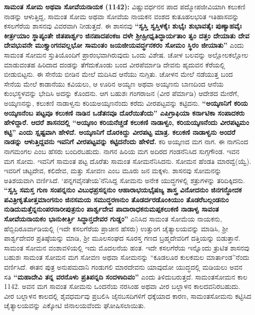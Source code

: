 \textbf{ಸಾಮಂತ ಸೋಮ ಅಥವಾ ಸೋವೆಯನಾಯಕ (1142):} ವಿಷ್ಣುವರ್ಧನನ ಪಾದ ಪದ್ಮೋಪಜೀವಿಯಾಗಿ ಕಲುಕಣಿ ನಾಡನ್ನು ಆಳುತ್ತಿದ್ದ, ಸಾಮಂತ ಸೋಮ ಅಥವಾ ಸೋವೆಯ ನಾಯಕನ ವಂಶದ ಕುತೂಹಲಭರಿತ ಇತಿಹಾಸವನ್ನು ಕಸಲಗೆರೆಯ ಶಾಸನವು ವಿವರವಾಗಿ ನೀಡುತ್ತದೆ. ಈ ಶಾಸನವು \textbf{“ಸ್ವಸ್ತಿ ಸ್ವಸ್ತಿಳಕೈಃ ಶುಭೈಃ ಶುಭಾವತೈಃ ಪುಣ್ಯಾಹವೈಃ ಕೀರ್ತ್ರಯಾಂ ಸ್ಥಾಪ್ಯಂತೇ ಜಿತಪಾರ್ಶ್ವಂ ಜಿನಪಾದಪಂಕಜ ದಳೇ ಶ‍್ರೀಹ್ರೀಧೃತಿದ್ಧಾರ್ಯತಾಂ ತ್ವಂ ದತ್ತಂ ದೇಯಾತು ದೇವ ದೇವಭುವನೇ ಮುಕ್ತ್ಯಾಂಗನವಲ್ಲಭೋ ಸಾಮಂತಂ ಜಯಜೀಯವರ್ದ್ಧನಕರಂ ಸೋಮಂ ಸ್ಥಿರಂ ಜೀಯಾತು”} ಎಂದು ಸಾಮಂತ ಸೋಮನ ಸ್ತುತಿಯೊಂದಿಗೆ ಪ್ರಾರಂಭವಾಗಿರುವುದು ಒಂದು ವಿಶೇಷ. ಚೋಳ ಬಲವನ್ನು ಅಲ್ಲೋಲಕಲ್ಲೋಲ ಮಾಡುವಂತಹ ಹಿರಿದಾದ ದಂಡನ್ನು ತೆಗೆದುಕೊಂಡು ಬಂದ ವೀರಪೆರ್ಮಾಡಿ ದೇವನು ಹೃದುವನ ಕೆರೆಯಲ್ಲಿ ಬೀಡುಬಿಟ್ಟನು. ಈ ಸೇನೆಯ ಬೀಡಿನ ಮೇಲೆ ಮದಿಸಿದ ಆನೆಯು ನುಗ್ಗಿತು. ಚೋಳನ ಮೇಲೆ ನಡೆಯುತ್ತ ಬಂದ ಸೇನೆಯ ಮೇಲೆ ಕಾಡಾನೆಯು ಕವಿಯಲು, ಆ ಊರಿನ ಅಯ್ಯಣ ಅಥವಾ ಅಯ್ಕಣನು ಬಾಣದಿಂದ ಆನೆಯ ಕುಂಭಸ್ಥಳವನ್ನು ಭೇದಿಸಿ ಅದನ್ನು ಕೊಂದನು. ಆಗ ಬಹುಶಃ ಗಂಗರಾಜನ (ವೀರ ಪೆರ್ಮಾಡಿ) ಆದೇಶದ ಮೇರೆಗೆ, ಅಯ್ಕಣನನ್ನು, ಕಲುಕಣಿ ನಾಡಾಳ್ವನು ಕರಿಯಅಯ್ಕಣನೆಂದು ಕರೆದು ವೀರಪಟ್ಟವನ್ನು ಕಟ್ಟಿದನು. \textbf{“ಅಯ್ಕಣನಿಗೆ ಕರಿಯ ಅಯ್ಕಣನೆಂಬ ಪಟ್ಟವೂ ಕಲುಕಣಿ ನಾಡಿನ ಒಡೆತನವೂ ದೊರೆಯಿತೆಂದು” ಎಪಿಗ್ರಾಫಿಯಾ ಕರ್ನಾಟಿಕಾ ಸಂಪಾದಕರು ಹೇಳಿದ್ದಾರೆ. ಆದರೆ ಶಾಸನದಲ್ಲಿ “ಅಯ್ಕಣಂ ಕರಿಯನೆಚ್ಚಡೆ ಕಲುಕಣಿ ನಾಡಾಳ್ವಂ, ಕರಿಯಯ್ಕಣನೆಂದು ವೀರಪಟ್ಟಮಂ ಕಟ್ಟಿ” ಎಂದು ಸ್ಷಷ್ಟವಾಗಿ ಹೇಳಿದೆ. ಅಯ್ಕಣನಿಗೆ ದೊರಕಿದ್ದು ವೀರಪಟ್ಟ ಮಾತ್ರ. ಕಲುಕಣಿ ನಾಡಾಳ್ವನು ಅಂದರೆ ನಾಡನ್ನು ಆಳುತ್ತಿದ್ದವನು ಇವನಿಗೆ ವೀರಪಟ್ಟವನ್ನು ಕಟ್ಟಿದನೆಂದು ಹೇಳಿದೆ.} ಕರಿ ಅಯ್ಕಣದ ಮಗ ನಾಗ. ಈ ನಾಗನಿಂದ ನಾಗಮಂಗಲ ಎಂಬ ಹೆಸರು ಬಂದಿರಬಹುದು. ನಾಗನ ಹಿರಿಯ ಮಗ ಅದಿರದ ಗಂಡನೆನಿಸಿದ ಸುಗ್ಗಗೌಂಡ. ಇವನ ಮಗ ಸೋಮ. ಇವನಿಗೆ ಸಾಮಂತ ಪಟ್ಟ ದೊರೆತು ಸಾಮಂತ ಸೋಮನೆನಿಸಿದನು. ಸೋಮನ ಹೆಂಡತಿ ಮಾರವ್ವೆ(ಯ್ವೆ). ಇವರಿಗೆ ಚಟ್ಟದೇವ, ಕಲಿದೇವ, ಮತ್ತು ಸೋವಣ ಎಂಬ ಮೂರು ಜನ ಮಕ್ಕಳು. ಶಾಸನವು ಸೋಮನನ್ನು ಅತಿಶಯವಾಗಿ ವರ್ಣಿಸಿದೆ. ‘ಪನ್ನಗವೈನತೇಯ’ನೆನಿಸಿದ್ದ ಸೋಮನು ಅನೇಕ ಯುದ್ಧಗಳಲ್ಲಿ ಶತ್ರುಗಳನ್ನು ತರಿದಿಕ್ಕಿದನು. \textbf{“ಸ್ವಸ್ತಿ ಸಮಸ್ತ ಗುಣ ಸಂಪನ್ನನುಂ ವಿಬುಧಪ್ರಸನ್ನನುಂ ಆಹಾರಾಭಯಭೈಷಜ್ಯ ಶಾಸ್ತ್ರ ವಿನೋದನುಂ ಜಿನಗನ್ಧೋದಕ ಪವಿತ್ರೀಕೃತೋತ್ತಮಾಂಗನುಂ ಜಿನಸಮಯ ಸಮುದ್ಧರಣನುಂ ತೊಡರ್ದರಡೊಂಕಿಯುಂ ತೊಡರೆಬಲ್ಗಂಡನುಂ ನುಡಿದುಮತ್ತೆನ್ನನುಂಪರನಾರೀಪುತ್ರನುಂ ಪಾರ್ಶ್ವದೇವ ಪಾದಾರಾಧಕನುಮಪ್ಪಕಲುಕಣಿ ನಾಡಾಳ್ವ ಸಾವಂತ ಸೋವೆಯನಾಯಕಂ ಭಾನುಕೀರ್ತ್ತಿ ಸಿದ್ಧಾನ್ತದೇವರ ಗುಡ್ಡಂ”} ಎನಿಸಿದ ಸಾಮಂತ ಸೋಮೆಯ ನಾಯಕನು, ಹೆಬ್ಬಿದಿರೂರ್ವಾಡಿಯಲ್ಲಿ (ಇದೇ ಕಸಲಗೆರೆಯ ಪ್ರಾಚೀನ ಹೆಸರು) ಉತ್ತುಂಗ ಚೈತ್ಯಾಲಯವನ್ನು ಮಾಡಿಸಿ, ಶ‍್ರೀ ಪಾರ್ಶ್ವದೇವರ ಪ್ರತಿಷ್ಠೆಯನ್ನು ಮಾಡಿ, ಶ‍್ರೀ ಮೂಲಸಂಘದ ಸೂರಸ್ತ ಗಣದ ಬ್ರಹ್ಮದೇವರಿಗೆ ದತ್ತಿಯನ್ನು ಬಿಡುತ್ತಾನೆ. ಸಾಮಂತ ಸೋಮನ ವಂಶಾವಳಿಯಲ್ಲಿ ಇದು ಮೊದಲನೆಯ ಹಂತ. ಇದೇ ಕಸಲಗೆರೆಯ ಇನ್ನೊಂದು ತ್ರುಟಿತ ಶಾಸನವು ಬಹುಶಃ ಸಾಮಂತ ಸೋಮನ ಮಗ ಸೋವಣ ಅಥವಾ ಸೋಮನನ್ನು “ಕೂಡಲೂರ ಕುಲಕಮಲ ಮಾರ್ತಾಂಡ”ನೆಂದು ವರ್ಣಿಸಿದೆ. ಈತನ ಪುತ್ರ ಅನುಪಮದಾನಿ ಗಂಡುಗಲಿ ಮಾರದೇವನು ಯಾವುದೋ ಯುದ್ಧದಲ್ಲಿ ಮಡಿಯಲು ಅವನ ಸತಿ \textbf{“ಮಹಾದೇವಿ ತನ್ನ ವರನೊಳು ಪ್ರತಿಪನ್ನದಿ ಸಂದಳಾದಿವಂ” }ಎಂದು ತಿಳಿದುಬರುತ್ತದೆ. ಸಾಮಂತಸೋಮನ ಕಾಲ 1142. ಅವನ ಮಗ ಸಾವಂತ ಸೋಮನು ಒಂದನೆಯ ನರಸಿಂಹ ಅಥವಾ ವೀರ ಬಲ್ಲಾಳನ ಕಾಲದವನಿರಬಹುದು. ವೀರ ಬಲ್ಲಾಳನ ಕಾಲದಲ್ಲಿ ಶೈವಧರ್ಮವು ಪ್ರಬಲಿಸಿ ಜೈನಬಸದಿಗಳಿಗೆ ಧಕ್ಕೆಯಾದ ಕಾರಣ, ಸಾಮಂತಸೋಮನು ಕಟ್ಟಿಸಿದ ಚೈತ್ಯಾಲಯವನ್ನು ಎಕ್ಕೋಟಿ ಜಿನಾಲಯವೆಂದು ಘೋಷಿಸಲಾಯಿತು.

